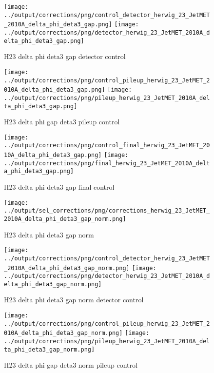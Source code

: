 \documentclass[11pt]{book}
\begin{document}
\begin{figure}[ht]
\centering
\texttt{[image: ../output/corrections/png/control\_detector\_herwig\_23\_JetMET\_2010A\_delta\_phi\_deta3\_gap.png]}
\texttt{[image: ../output/corrections/png/detector\_herwig\_23\_JetMET\_2010A\_delta\_phi\_deta3\_gap.png]}
\caption{H23 delta phi deta3 gap detector control}
\label{fig:H23_JetMET_2010A_delta_phi_deta3_gap_detector_control}
\end{figure}

\begin{figure}[ht]
\centering
\texttt{[image: ../output/corrections/png/control\_pileup\_herwig\_23\_JetMET\_2010A\_delta\_phi\_deta3\_gap.png]}
\texttt{[image: ../output/corrections/png/pileup\_herwig\_23\_JetMET\_2010A\_delta\_phi\_deta3\_gap.png]}
\caption{H23 delta phi gap deta3 pileup control}
\label{fig:H23_JetMET_2010A_delta_phi_deta3_gap_pileup_control}
\end{figure}


\begin{figure}[ht]
\centering
\texttt{[image: ../output/corrections/png/control\_final\_herwig\_23\_JetMET\_2010A\_delta\_phi\_deta3\_gap.png]}
\texttt{[image: ../output/corrections/png/final\_herwig\_23\_JetMET\_2010A\_delta\_phi\_deta3\_gap.png]}
\caption{H23 delta phi deta3 gap final control}
\label{fig:H23_JetMET_2010A_delta_phi_deta3_gap_final_control}
\end{figure}


\begin{figure}[ht]
\centering
\texttt{[image: ../output/sel\_corrections/png/corrections\_herwig\_23\_JetMET\_2010A\_delta\_phi\_deta3\_gap\_norm.png]}
\caption{H23 delta phi deta3 gap norm}
\label{fig:H23_JetMET_2010A_delta_phi_deta3_gap_norm}
\end{figure}


\begin{figure}[ht]
\centering
\texttt{[image: ../output/corrections/png/control\_detector\_herwig\_23\_JetMET\_2010A\_delta\_phi\_deta3\_gap\_norm.png]}
\texttt{[image: ../output/corrections/png/detector\_herwig\_23\_JetMET\_2010A\_delta\_phi\_deta3\_gap\_norm.png]}
\caption{H23 delta phi deta3 gap norm detector control}
\label{fig:H23_JetMET_2010A_delta_phi_deta3_gap_norm_detector_control}
\end{figure}

\begin{figure}[ht]
\centering
\texttt{[image: ../output/corrections/png/control\_pileup\_herwig\_23\_JetMET\_2010A\_delta\_phi\_deta3\_gap\_norm.png]}
\texttt{[image: ../output/corrections/png/pileup\_herwig\_23\_JetMET\_2010A\_delta\_phi\_deta3\_gap\_norm.png]}
\caption{H23 delta phi gap deta3 norm pileup control}
\label{fig:H23_JetMET_2010A_delta_phi_deta3_gap_norm_pileup_control}
\end{figure}
\end{document}
